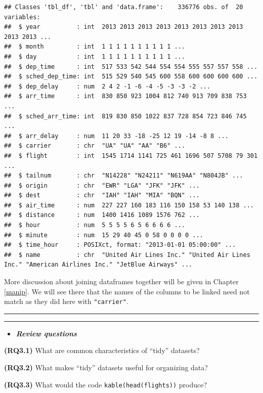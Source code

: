\documentclass[]{tufte-book}
\newenvironment{rmdblock}[1]
  {\begin{shaded*}
  \begin{itemize}
  \renewcommand{\labelitemi}{
    \raisebox{-.7\height}[0pt][0pt]{
    }
  }
  \item
  }
  {
  \end{itemize}
  \end{shaded*}
  }
\newenvironment{review}
  {\begin{rmdblock}{warning}}
  {\end{rmdblock}}
\begin{document}
\begin{verbatim}
## Classes 'tbl_df', 'tbl' and 'data.frame':    336776 obs. of  20 variables:
##  $ year          : int  2013 2013 2013 2013 2013 2013 2013 2013 2013 2013 ...
##  $ month         : int  1 1 1 1 1 1 1 1 1 1 ...
##  $ day           : int  1 1 1 1 1 1 1 1 1 1 ...
##  $ dep_time      : int  517 533 542 544 554 554 555 557 557 558 ...
##  $ sched_dep_time: int  515 529 540 545 600 558 600 600 600 600 ...
##  $ dep_delay     : num  2 4 2 -1 -6 -4 -5 -3 -3 -2 ...
##  $ arr_time      : int  830 850 923 1004 812 740 913 709 838 753 ...
##  $ sched_arr_time: int  819 830 850 1022 837 728 854 723 846 745 ...
##  $ arr_delay     : num  11 20 33 -18 -25 12 19 -14 -8 8 ...
##  $ carrier       : chr  "UA" "UA" "AA" "B6" ...
##  $ flight        : int  1545 1714 1141 725 461 1696 507 5708 79 301 ...
##  $ tailnum       : chr  "N14228" "N24211" "N619AA" "N804JB" ...
##  $ origin        : chr  "EWR" "LGA" "JFK" "JFK" ...
##  $ dest          : chr  "IAH" "IAH" "MIA" "BQN" ...
##  $ air_time      : num  227 227 160 183 116 150 158 53 140 138 ...
##  $ distance      : num  1400 1416 1089 1576 762 ...
##  $ hour          : num  5 5 5 5 6 5 6 6 6 6 ...
##  $ minute        : num  15 29 40 45 0 58 0 0 0 0 ...
##  $ time_hour     : POSIXct, format: "2013-01-01 05:00:00" ...
##  $ name          : chr  "United Air Lines Inc." "United Air Lines Inc." "American Airlines Inc." "JetBlue Airways" ...
\end{verbatim}

More discussion about joining dataframes together will be given in
Chapter \ref{manip}. We will see there that the names of the columns to
be linked need not match as they did here with \texttt{"carrier"}.

\begin{center}\rule{0.5\linewidth}{\linethickness}\end{center}

\begin{center}\rule{0.5\linewidth}{\linethickness}\end{center}

\begin{review}
\textbf{\emph{Review questions}}
\end{review}

\textbf{(RQ3.1)} What are common characteristics of ``tidy'' datasets?

\textbf{(RQ3.2)} What makes ``tidy'' datasets useful for organizing
data?

\textbf{(RQ3.3)} What would the code \texttt{kable(head(flights))}
produce?
\end{document}
